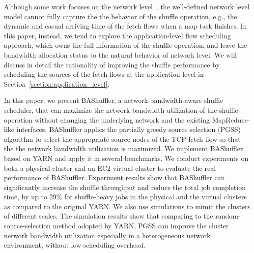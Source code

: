 \documentclass[10pt,journal,compsoc]{IEEEtran}
\begin{document}
Although some work focuses on the network level~\cite{shieh2011sharing,chowdhury2011managing,chowdhury2014efficient,chowdhury2015efficient}, 
the well-defined network level model cannot fully capture the the behavior of the shuffle operation, e.g., the dynamic and casual arriving time of the fetch flows
when a map task finishes. 
In this paper, instead, we tend to explore the application-level flow scheduling approach, 
which owns the full information of the shuffle operation, 
and leave the bandwidth allocation status to the natural behavior of network level. 
We will discuss in detail the rationality of improving the shuffle performance by scheduling the sources of the fetch flows at the application level in Section~\ref{section:application_level}.

In this paper, 
we present BAShuffler, a network-bandwidth-aware shuffle scheduler, 
that can maximize the network bandwidth utilization of the shuffle operation
without changing the underlying network and the existing MapReduce-like interfaces. 
BAShuffler applies the partially
greedy source selection (PGSS) algorithm
to select the appropriate source nodes of the TCP fetch flow so that 
the the network bandwidth utilization is maximized. 
We implement BAShuffler based on YARN and apply it in
several benchmarks.
We conduct experiments on both a physical cluster and an EC2
virtual cluster to evaluate the real performance of BAShuffler. 
Experiment results show that BAShuffler can significantly increase the
shuffle throughput
and reduce the total job completion time, by up to 29\% for
shuffle-heavy jobs in the physical and the virtual clusters
as compared to the original YARN. 
We also use simulations to mimic the clusters of different scales. 
The simulation results show that comparing to the
random-source-selection method adopted by YARN, 
PGSS can improve the cluster network bandwidth
utilization especially in a heterogeneous network environment, without low scheduling overhead.
\end{document}
